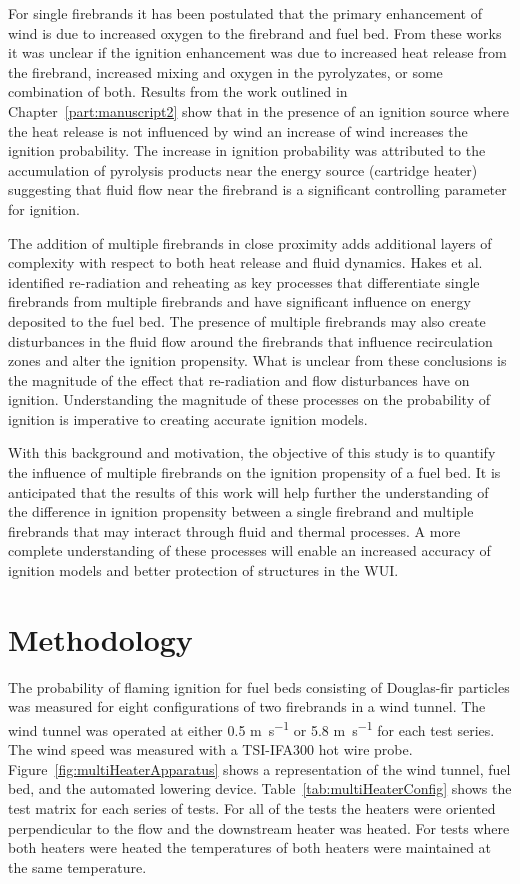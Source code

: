    For single firebrands it has been postulated that the primary enhancement of wind is due to increased oxygen to the firebrand and fuel bed. From these works it was unclear if the ignition enhancement was due to increased heat release from the firebrand, increased mixing and oxygen in the pyrolyzates, or some combination of both. Results from the work outlined in Chapter~\ref{part:manuscript2} show that in the presence of an ignition source where the heat release is not influenced by wind an increase of wind increases the ignition probability. The increase in ignition probability was attributed to the accumulation of pyrolysis products near the energy source (cartridge heater) suggesting that fluid flow near the firebrand is a significant controlling parameter for ignition. 
    
    The addition of multiple firebrands in close proximity adds additional layers of complexity with respect to both heat release and fluid dynamics.  Hakes et al.~\cite{Hakes2019a} identified re-radiation and reheating as key processes that differentiate single firebrands from multiple firebrands and have significant influence on energy deposited to the fuel bed.  The presence of multiple firebrands may also create disturbances in the fluid flow around the firebrands that influence recirculation zones and alter the ignition propensity. What is unclear from these conclusions is the magnitude of the effect that re-radiation and flow disturbances have on ignition. Understanding the magnitude of these processes on the probability of ignition is imperative to creating accurate ignition models. 
    
    With this background and motivation, the objective of this study is to quantify the influence of multiple firebrands on the ignition propensity of a fuel bed. It is anticipated that the results of this work will help further the understanding of the difference in ignition propensity between a single firebrand and multiple firebrands that may interact through fluid and thermal processes. A more complete understanding of these processes will enable an increased accuracy of ignition models and better protection of structures in the WUI.
    
    
\section{Methodology}
    The probability of flaming ignition for fuel beds consisting of Douglas-fir particles was measured for eight configurations of two firebrands in a wind tunnel. The wind tunnel was operated at either 0.5 \si{\meter\per\second} or 5.8 \si{\meter\per\second} for each test series. The wind speed was measured with a TSI-IFA300 hot wire probe. Figure~\ref{fig:multiHeaterApparatus} shows a representation of the wind tunnel, fuel bed, and the automated lowering device. Table~\ref{tab:multiHeaterConfig} shows the test matrix for each series of tests. For all of the tests the heaters were oriented perpendicular to the flow and the downstream heater was heated. For tests where both heaters were heated the temperatures of both heaters were maintained at the same temperature. 
    
